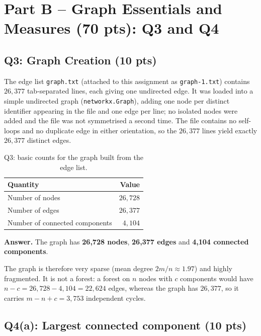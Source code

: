 \section*{Part B -- Graph Essentials and Measures (70 pts): Q3 and Q4}

\subsection*{Q3: Graph Creation (10 pts)}

The edge list \texttt{graph.txt} (attached to this assignment as
\texttt{graph-1.txt}) contains $26{,}377$ tab-separated lines, each giving one
undirected edge. It was loaded into a simple undirected graph
(\texttt{networkx.Graph}), adding one node per distinct identifier appearing in
the file and one edge per line; no isolated nodes were added and the file was
not symmetrised a second time. The file contains no self-loops and no duplicate
edge in either orientation, so the $26{,}377$ lines yield exactly $26{,}377$
distinct edges.

\begin{table}[ht]
  \centering
  \begin{tabular}{lr}
    \toprule
    Quantity & Value \\
    \midrule
    Number of nodes                & $26{,}728$ \\
    Number of edges                & $26{,}377$ \\
    Number of connected components & $4{,}104$  \\
    \bottomrule
  \end{tabular}
  \caption{Q3: basic counts for the graph built from the edge list.}
  \label{p2:tab:q3}
\end{table}

\noindent\textbf{Answer.} The graph has \textbf{26{,}728 nodes},
\textbf{26{,}377 edges} and \textbf{4{,}104 connected components}.

The graph is therefore very sparse (mean degree $2m/n \approx 1.97$) and highly
fragmented. It is not a forest: a forest on $n$ nodes with $c$ components would
have $n-c = 26{,}728-4{,}104 = 22{,}624$ edges, whereas the graph has
$26{,}377$, so it carries $m-n+c = 3{,}753$ independent cycles.

\subsection*{Q4(a): Largest connected component (10 pts)}

